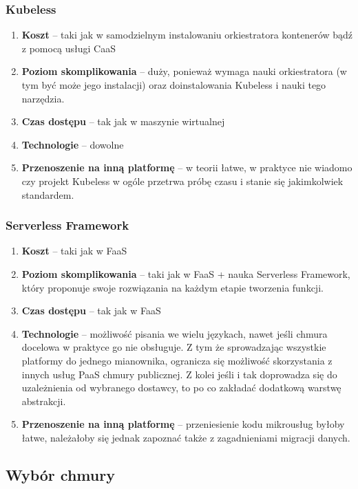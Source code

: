 \documentclass[12pt,a4paper,twoside,titlepage,openright]{book}
\begin{document}
\subsubsection{Kubeless}

\begin{enumerate}
	\item \textbf{Koszt} -- taki jak w samodzielnym instalowaniu orkiestratora kontenerów bądź z pomocą usługi CaaS
	\item \textbf{Poziom skomplikowania} -- duży, ponieważ wymaga nauki orkiestratora (w tym być może jego instalacji) oraz doinstalowania Kubeless i nauki tego narzędzia.
	\item \textbf{Czas dostępu} -- tak jak w maszynie wirtualnej
	\item \textbf{Technologie} -- dowolne
	\item \textbf{Przenoszenie na inną platformę} -- w teorii łatwe, w praktyce nie wiadomo czy projekt Kubeless w ogóle przetrwa próbę czasu i stanie się jakimkolwiek standardem.
\end{enumerate}

\subsubsection{Serverless Framework}

\begin{enumerate}
	\item \textbf{Koszt} -- taki jak w FaaS
	\item \textbf{Poziom skomplikowania} -- taki jak w FaaS + nauka Serverless Framework, który proponuje swoje rozwiązania na każdym etapie tworzenia funkcji. 
	\item \textbf{Czas dostępu} -- tak jak w FaaS
	\item \textbf{Technologie} -- możliwość pisania we wielu językach, nawet jeśli chmura docelowa w praktyce go nie obsługuje. Z tym że sprowadzając wszystkie platformy do jednego mianownika, ogranicza się możliwość skorzystania z innych usług PaaS chmury publicznej. Z kolei jeśli i tak doprowadza się do uzależnienia od wybranego dostawcy, to po co zakładać dodatkową warstwę abstrakcji.
	\item \textbf{Przenoszenie na inną platformę} -- przeniesienie kodu mikrousług byłoby łatwe, należałoby się jednak zapoznać także z zagadnieniami migracji danych.
\end{enumerate}
	
\subsection{Wybór chmury}
\end{document}
